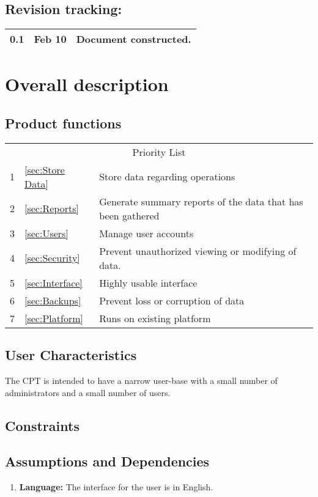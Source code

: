\documentclass[12pt]{article}
\begin{document}
\subsection{Revision tracking:}
\begin{tabular}{|l|r|p{5in}|}
\hline
0.1 & Feb 10 & Document constructed.\\
\hline
\end{tabular}

\section{Overall description}
\subsection{Product functions}

\begin{tabular}{l | l p{5.25in}}
\multicolumn{3}{c}{Priority List}\\
1 &\ref{sec:Store Data}			& Store data regarding operations \\
2 &\ref{sec:Reports}			& Generate summary reports of the data that has been gathered\\
3 &\ref{sec:Users}				& Manage user accounts\\
4 &\ref{sec:Security}			& Prevent unauthorized viewing or modifying of data. \\
5 &\ref{sec:Interface}			& Highly usable interface\\ 
6 &\ref{sec:Backups}			& Prevent loss or corruption of data\\
7 &\ref{sec:Platform}			& Runs on existing platform\\
\end{tabular}

\subsection{User Characteristics}
The CPT is intended to have a narrow user-base with a small number of administrators and a small number of users.

\subsection{Constraints}


\subsection{Assumptions and Dependencies}
\begin{enumerate}
\item \textbf{Language:} The interface for the user is in English.
\end{enumerate}
\end{document}
